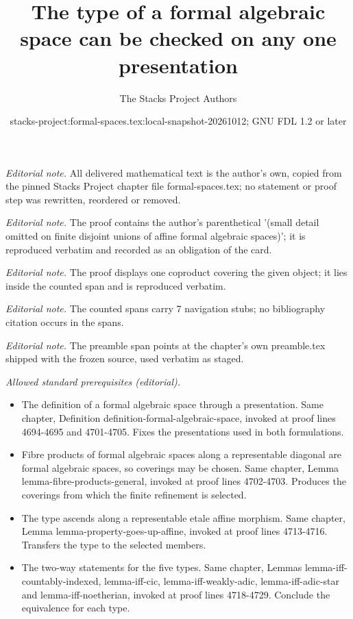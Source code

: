 \documentclass{stacks-project}
\title{The type of a formal algebraic space can be checked on any one presentation}
\author{The Stacks Project Authors}
\date{stacks-project:formal-spaces.tex:local-snapshot-20261012; GNU FDL 1.2 or later}
\theoremstyle{plain}
\theoremstyle{definition}
\theoremstyle{remark}
\numberwithin{equation}{subsection}
\begin{document}
\maketitle
\noindent\textit{Editorial note.} All delivered mathematical text is the author's own, copied from the pinned Stacks Project chapter file formal-spaces.tex; no statement or proof step was rewritten, reordered or removed.\par\medskip
\noindent\textit{Editorial note.} The proof contains the author's parenthetical '(small detail omitted on finite disjoint unions of affine formal algebraic spaces)'; it is reproduced verbatim and recorded as an obligation of the card.\par\medskip
\noindent\textit{Editorial note.} The proof displays one coproduct covering the given object; it lies inside the counted span and is reproduced verbatim.\par\medskip
\noindent\textit{Editorial note.} The counted spans carry 7 navigation stubs; no bibliography citation occurs in the spans.\par\medskip
\noindent\textit{Editorial note.} The preamble span points at the chapter's own preamble.tex shipped with the frozen source, used verbatim as staged.\par\medskip
\noindent\textit{Allowed standard prerequisites (editorial).}\begin{itemize}
\item The definition of a formal algebraic space through a presentation. Same chapter, Definition definition-formal-algebraic-space, invoked at proof lines 4694-4695 and 4701-4705. Fixes the presentations used in both formulations.
\item Fibre products of formal algebraic spaces along a representable diagonal are formal algebraic spaces, so coverings may be chosen. Same chapter, Lemma lemma-fibre-products-general, invoked at proof lines 4702-4703. Produces the coverings from which the finite refinement is selected.
\item The type ascends along a representable etale affine morphism. Same chapter, Lemma lemma-property-goes-up-affine, invoked at proof lines 4713-4716. Transfers the type to the selected members.
\item The two-way statements for the five types. Same chapter, Lemmas lemma-iff-countably-indexed, lemma-iff-cic, lemma-iff-weakly-adic, lemma-iff-adic-star and lemma-iff-noetherian, invoked at proof lines 4718-4729. Conclude the equivalence for each type.
\end{itemize}\medskip
\end{document}
